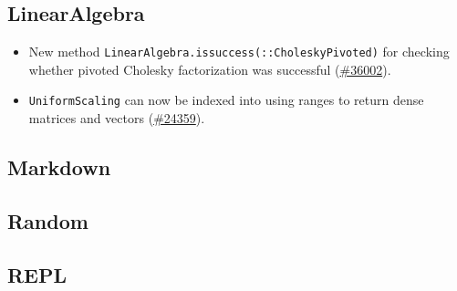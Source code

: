 \hypertarget{5352389965411431652}{}


\subsection{LinearAlgebra}



\begin{itemize}
\item New method \texttt{LinearAlgebra.issuccess(::CholeskyPivoted)} for checking whether pivoted Cholesky factorization was successful (\href{https://github.com/JuliaLang/julia/issues/36002}{\#36002}).


\item \texttt{UniformScaling} can now be indexed into using ranges to return dense matrices and vectors (\href{https://github.com/JuliaLang/julia/issues/24359}{\#24359}).

\end{itemize}


\hypertarget{1148945260684419988}{}


\subsection{Markdown}



\hypertarget{1261002482238112410}{}


\subsection{Random}



\hypertarget{2420424062759544635}{}


\subsection{REPL}




